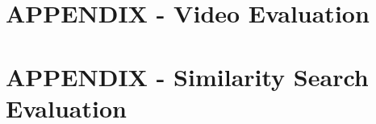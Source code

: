 \appendix

\section{APPENDIX - Video Evaluation}


\clearpage

\section{APPENDIX - Similarity Search Evaluation}








